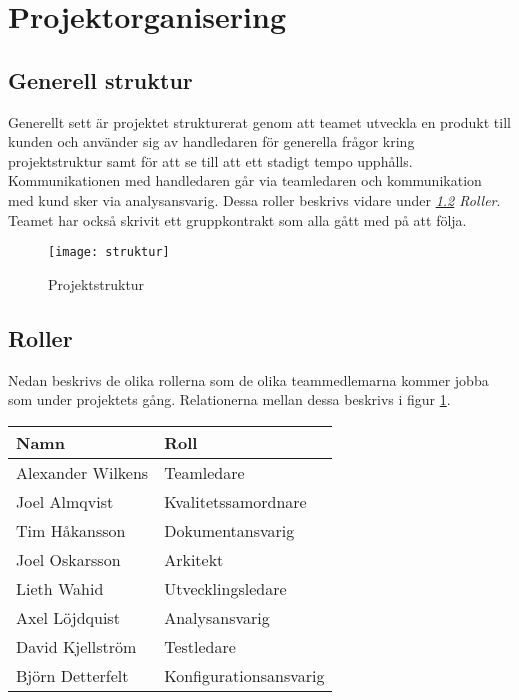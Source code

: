 \section{Projektorganisering}
\subsection{Generell struktur}
Generellt sett är projektet strukturerat genom att teamet utveckla en produkt till kunden och använder sig av
handledaren för generella frågor kring projektstruktur samt för att se till att ett stadigt tempo upphålls.
Kommunikationen med handledaren går via teamledaren och kommunikation med kund sker via analysansvarig. Dessa roller
beskrivs vidare under \textit{\ref{subsec:roles} Roller}. Teamet har också skrivit ett gruppkontrakt\cite{bib-gruppkontrakt} som alla gått med på att följa.

\begin{figure}[h]
    \centering
    \texttt{[image: struktur]}
    \caption{Projektstruktur}
    \label{fig:struktur}
\end{figure}



\subsection{Roller}
\label{subsec:roles}
Nedan beskrivs de olika rollerna som de olika teammedlemarna kommer jobba som under projektets
gång. Relationerna mellan dessa beskrivs i figur \ref{fig:struktur}.

\begin{center}
    \begin{tabular}{| l | l |}
        \hline
        \textbf{Namn} & \textbf{Roll} \\
        \hline
        \centering Alexander Wilkens & Teamledare\\
        \hline
        \centering Joel Almqvist & Kvalitetssamordnare\\
        \hline
        \centering Tim Håkansson & Dokumentansvarig\\
        \hline
        \centering Joel Oskarsson & Arkitekt\\
        \hline
        \centering Lieth Wahid & Utvecklingsledare\\
        \hline
        \centering Axel Löjdquist & Analysansvarig\\
        \hline
        \centering David Kjellström & Testledare\\
        \hline
        \centering Björn Detterfelt & Konfigurationsansvarig\\
        \hline
    \end{tabular}
\end{center}
